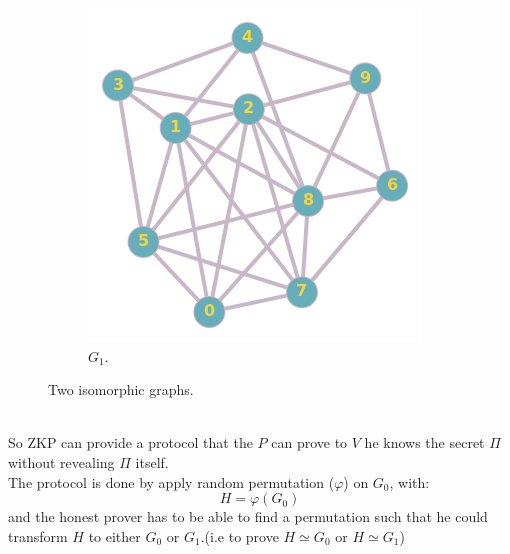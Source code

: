\documentclass[12pt,a4paper]{article}
\begin{document}
\begin{figure}[h!]
\begin{subfigure}[b]{.39\linewidth}
		\includegraphics[width=\linewidth]{ex2_2.png}
		\caption{$G_1$.}
	\end{subfigure}
	\caption{Two isomorphic graphs.}
	\label{fig:Two isomorphic graphs has 10 vertices and 28 edges}
\end{figure}\\
So ZKP can provide a protocol that the $P$ can prove to $V$ he knows the secret $\Pi$ without revealing $\Pi$ itself.\\
The protocol is done by apply random permutation ($\varphi$) on $G_0$, with: $$H=\varphi(G_0)$$ and the honest prover has to be able to find a permutation such that he could transform $H$ to either $G_0$ or $G_1$.(i.e to prove $H\simeq G_0$ or $H\simeq G_1$)\\
\end{document}
